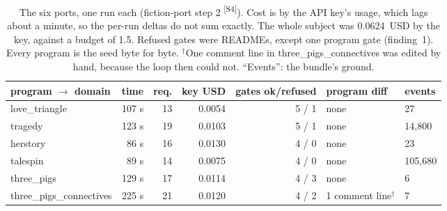 \documentclass[11pt]{article}
\newcommand{\src}[1]{\textsuperscript{[#1]}}
\begin{document}
\begin{table}[t]
\small\centering
\begin{tabular}{@{}lrrrrll@{}}
\toprule
program $\to$ domain & time & req. & key USD & gates ok/refused & program diff & events \\
\midrule
love\_triangle & 107 s & 13 & 0.0054 & 5 / 1 & none & 27 \\
tragedy & 123 s & 19 & 0.0103 & 5 / 1 & none & 14{,}800 \\
herstory & 86 s & 16 & 0.0130 & 4 / 0 & none & 23 \\
talespin & 89 s & 14 & 0.0075 & 4 / 0 & none & 105{,}680 \\
three\_pigs & 129 s & 17 & 0.0114 & 4 / 3 & none & 6 \\
three\_pigs\_connectives & 225 s & 21 & 0.0120 & 4 / 2 & 1 comment line$^{\dagger}$ & 7 \\
\bottomrule
\end{tabular}
\caption{The six ports, one run each (fiction-port step 2 \src{S4}). Cost
is by the API key's usage, which lags about a minute, so the per-run
deltas do not sum exactly. The whole subject was 0.0624~USD by the key,
against a budget of 1.5. Refused gates were READMEs, except one program
gate (finding~1). Every program is the seed byte for byte. $^{\dagger}$One
comment line in three\_pigs\_connectives was edited by hand, because the
loop then could not. ``Events'': the bundle's ground.}
\label{tab:fiction}
\end{table}
\end{document}
